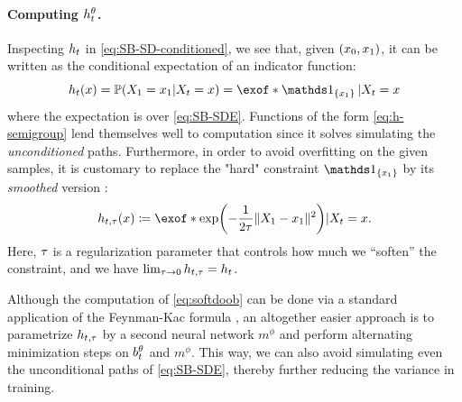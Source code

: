 \paragraph{Computing $h_t^\theta$.}

Inspecting $h_t$ in \eqref{eq:SB-SD-conditioned}, we see that, given $(x_0,x_1)$, it can be written as the conditional expectation of an indicator function:
\begin{equation}
\label{eq:h-semigroup}
\doob(\x) = \prob(X_1 = \x_1\vert X_t = \x) = \exof*{
\one_{\{\x_1\}}\vert X_t = \x}
\end{equation}where the expectation is over \eqref{eq:SB-SDE}. Functions of the form \eqref{eq:h-semigroup} lend themselves well to computation since it solves simulating the \emph{unconditioned} paths.
Furthermore, in order to avoid overfitting on the given samples, it is customary to replace the "hard" constraint $\one_{\{\x_1\}}$ by its \emph{smoothed} version \citep{zhang2021path, holdijk2022path}: 
\begin{equation}
\label{eq:softdoob}
\doobs(\x) \defeq \exof*{  \exp\parens*{-\frac{1}{2\reg}\norm{X_\horizon-\x_1}^2 }  \vert X_t = \x}.
\end{equation}Here, $\tau$ is a regularization parameter that controls how much we ``soften'' the constraint, and we have $\lim_{\tau\to 0} h_{t,\tau} = h_t$.

Although the computation of \eqref{eq:softdoob} can be done via a standard application of the Feynman-Kac formula \citep{rogers2000diffusions}, an altogether easier approach is to parametrize $h_{t,\tau}$ by a second neural network $m^{\phi}$ and perform alternating minimization steps on $b_t^\theta$ and $m^{\phi}$. This way, we can also avoid simulating even the unconditional paths of \eqref{eq:SB-SDE}, thereby further reducing the variance in training.

